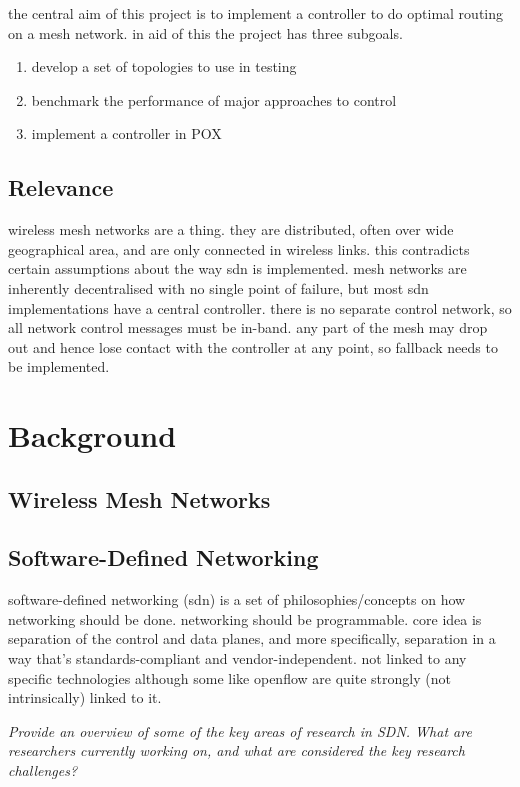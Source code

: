 \documentclass[pdftex,12pt,a4paper]{article}
\begin{document}
the central aim of this project is to implement a controller to do optimal routing on a mesh network. in aid of this the project has three subgoals.

\begin{enumerate}
\item develop a set of topologies to use in testing
\item benchmark the performance of major approaches to control
\item implement a controller in POX
\end{enumerate}

\subsection{Relevance}

wireless mesh networks are a thing. they are distributed, often over wide geographical area, and are only connected in wireless links. this contradicts certain assumptions about the way sdn is implemented. mesh networks are inherently decentralised with no single point of failure, but most sdn implementations have a central controller. there is no separate control network, so all network control messages must be in-band. any part of the mesh may drop out and hence lose contact with the controller at any point, so fallback needs to be implemented.

\newpage
\section{Background}
\subsection{Wireless Mesh Networks}

\subsection{Software-Defined Networking}
software-defined networking (sdn) is a set of philosophies/concepts on how networking should be done. networking should be programmable. core idea is separation of the control and data planes, and more specifically, separation in a way that's standards-compliant and vendor-independent. \cite{onf:norm} not linked to any specific technologies although some like openflow are quite strongly (not intrinsically) linked to it. 

\emph{Provide an overview of some of the key areas of research in SDN. What are researchers currently working on, and what are considered the key research challenges?}
\end{document}
